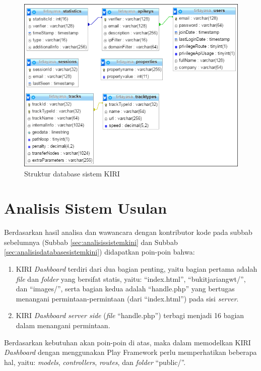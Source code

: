 \begin{figure}[htbp]
	\centering
		\includegraphics[scale=0.8]{Gambar/4_strukturdatabase.PNG}
	\caption{Struktur database sistem KIRI}
	\label{fig:4_strukturdatabase}
\end{figure}


\section{Analisis Sistem Usulan}
\label{sec:analisissistemusulan}
Berdasarkan hasil analisa dan wawancara dengan kontributor kode pada subbab sebelumnya (Subbab \ref{sec:analisissistemkini} dan Subbab \ref{sec:analisisdatabasesistemkini}) didapatkan poin-poin bahwa:
\begin{enumerate}
	\item KIRI \textit{Dashboard} terdiri dari dua bagian penting, yaitu bagian pertama adalah \textit{file} dan \textit{folder} yang bersifat statis, yaitu: ``index.html'', ``bukitjariangwt/'', dan ``images/'', serta bagian kedua adalah ``handle.php'' yang bertugas menangani permintaan-permintaan (dari ``index.html'') pada sisi \textit{server}.
	\item KIRI \textit{Dashboard server side} (\textit{file} ``handle.php'') terbagi menjadi 16 bagian dalam menangani permintaan.
\end{enumerate}

Berdasarkan kebutuhan akan poin-poin di atas, maka dalam memodelkan KIRI \textit{Dashboard} dengan menggunakan Play Framework perlu memperhatikan beberapa hal, yaitu: \textit{models}, \textit{controllers}, \textit{routes}, dan \textit{folder} ``public/''.

